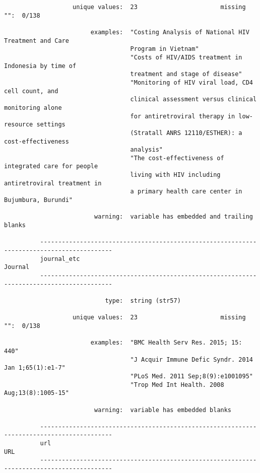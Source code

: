 \documentclass{article}
\begin{document}
\begin{verbatim}
                   unique values:  23                       missing "":  0/138
          
                        examples:  "Costing Analysis of National HIV Treatment and Care
                                   Program in Vietnam"
                                   "Costs of HIV/AIDS treatment in Indonesia by time of
                                   treatment and stage of disease"
                                   "Monitoring of HIV viral load, CD4 cell count, and
                                   clinical assessment versus clinical monitoring alone
                                   for antiretroviral therapy in low-resource settings
                                   (Stratall ANRS 12110/ESTHER): a cost-effectiveness
                                   analysis"
                                   "The cost-effectiveness of integrated care for people
                                   living with HIV including antiretroviral treatment in
                                   a primary health care center in Bujumbura, Burundi"
          
                         warning:  variable has embedded and trailing blanks
          
          ------------------------------------------------------------------------------------------
          journal_etc                                                                        Journal
          ------------------------------------------------------------------------------------------
          
                            type:  string (str57)
          
                   unique values:  23                       missing "":  0/138
          
                        examples:  "BMC Health Serv Res. 2015; 15: 440"
                                   "J Acquir Immune Defic Syndr. 2014 Jan 1;65(1):e1-7"
                                   "PLoS Med. 2011 Sep;8(9):e1001095"
                                   "Trop Med Int Health. 2008 Aug;13(8):1005-15"
          
                         warning:  variable has embedded blanks
          
          ------------------------------------------------------------------------------------------
          url                                                                                    URL
          ------------------------------------------------------------------------------------------
          

\end{verbatim}
\end{document}

